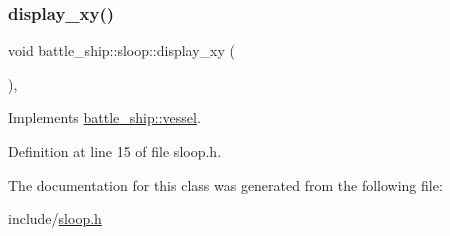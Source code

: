 \subsubsection{\texorpdfstring{display\+\_\+xy()}{display\_xy()}}
{\footnotesize\ttfamily void battle\+\_\+ship\+::sloop\+::display\+\_\+xy (\begin{DoxyParamCaption}{ }\end{DoxyParamCaption})\hspace{0.3cm}{\ttfamily [inline]}, {\ttfamily [virtual]}}



Implements \hyperlink{classbattle__ship_1_1vessel_a9e72e4a65466cbfe4c550d3741dbe824}{battle\+\_\+ship\+::vessel}.



Definition at line 15 of file sloop.\+h.



The documentation for this class was generated from the following file\+:\begin{DoxyCompactItemize}
\item 
include/\hyperlink{sloop_8h}{sloop.\+h}\end{DoxyCompactItemize}
